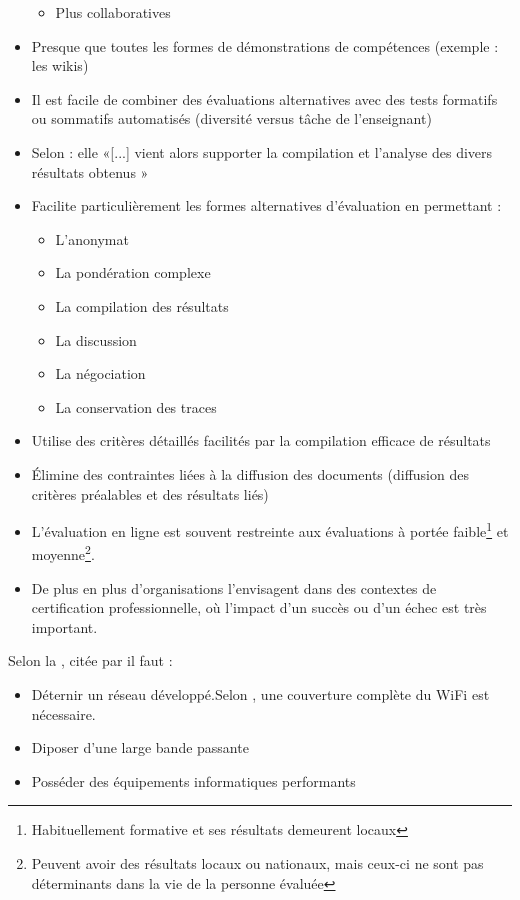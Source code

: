\documentclass[aspectratio=169]{beamer}
\begin{document}
\begin{frame}[allowframebreaks]
\begin{description}
\begin{itemize}
\begin {itemize}
									\item Plus collaboratives
								\end{itemize}
						\item Presque que toutes les formes de démonstrations de compétences (exemple : les wikis)
						\item Il est facile de combiner des évaluations alternatives avec des tests formatifs ou sommatifs automatisés (diversité versus tâche de l'enseignant)						
						\item Selon \citet{audet2011a} : elle «[...] vient alors supporter la compilation et l'analyse des divers résultats obtenus »
						\item Facilite particulièrement les formes alternatives d'évaluation en permettant :
					 	
					 	\begin {itemize}
									\item L'anonymat
									\item La pondération complexe
									\item La compilation des résultats
									\item La discussion
									\item La négociation
									\item La conservation des traces
						\end{itemize}
						\item Utilise des critères détaillés facilités par la compilation efficace de résultats
						\item Élimine des contraintes liées à la diffusion des documents (diffusion des critères préalables et des résultats liés)
						\item  L'évaluation en ligne est souvent restreinte aux évaluations à portée faible\footnote{Habituellement formative et ses résultats demeurent locaux} et moyenne\footnote{Peuvent avoir des résultats locaux ou nationaux, mais ceux-ci ne sont pas déterminants dans la vie de la personne évaluée}.
						\item De plus en plus d'organisations l'envisagent dans des contextes de certification professionnelle, où l'impact d'un succès ou d'un échec est très important.	
						\end{itemize}								
					\item[Les enjeux technologiques] Selon la \citet{NorthCarolina2013}, citée par \citet{Lamontagne2013} il faut :
						\begin {itemize}
							\item Déternir un réseau développé.Selon \citet{Stansbury2013B}, une couverture complète du WiFi est nécessaire.			\item Diposer d'une large bande passante
							\item Posséder des équipements informatiques performants
						\end{itemize} 
					

\end{description}
\end{frame}
\end{document}

